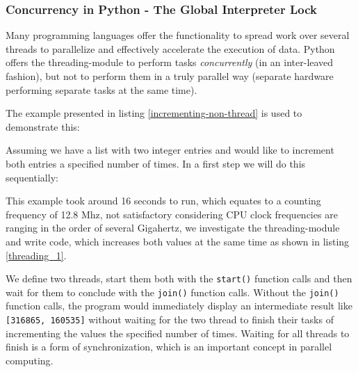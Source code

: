 \documentclass[english,11pt,a4paper,table]{article} %
\begin{document}
\subsubsection{Concurrency in Python - The Global Interpreter Lock}
\label{GIL-section}

Many programming languages offer the functionality to spread work over several threads to parallelize and effectively accelerate the execution of data. Python offers the threading-module \cite{threading} to perform tasks \emph{concurrently} (in an inter-leaved fashion), but not to perform them in a truly parallel way (separate hardware performing separate tasks at the same time).

The example presented in listing \ref{incrementing-non-thread} is used to demonstrate this:

Assuming we have a list with two integer entries and would like to increment both entries a specified number of times.
In a first step we will do this sequentially:


This example took around 16 seconds to run, which equates to a counting frequency of 12.8 Mhz, not satisfactory considering CPU clock frequencies are ranging in the order of several Gigahertz, we investigate the threading-module and write code, which increases both values at the same time as shown in listing \ref{threading_1}.

We define two threads, start them both with the \texttt{start()} function calls and then wait for them to conclude with the \texttt{join()} function calls.
Without the \texttt{join()} function calls, the program would immediately display an intermediate result like \texttt{[316865, 160535]} without waiting for the two thread to finish their tasks of incrementing the values the specified number of times.
Waiting for all threads to finish is a form of synchronization, which is an important concept in parallel computing.
\end{document}
